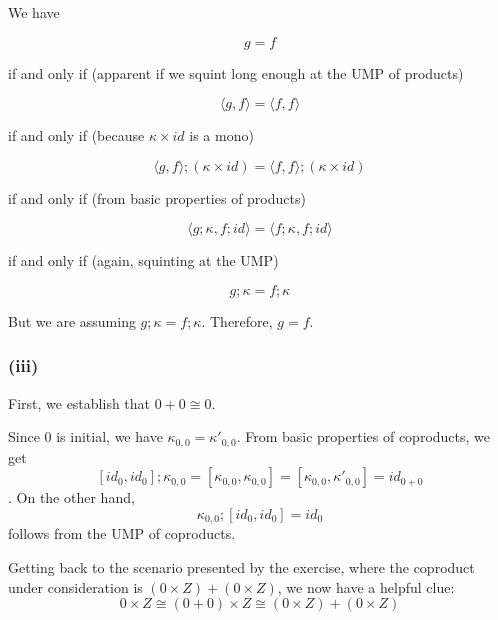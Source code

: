 \documentclass{article}
\begin{document}
We have 

$$ g = f $$

if and only if (apparent if we squint long enough at the UMP of products)

$$\langle g , f \rangle = \langle f, f \rangle$$

if and only if (because $\kappa \times id$ is a mono)

$$\langle g, f \rangle;(\kappa \times id) = \langle f, f \rangle;(\kappa \times id)$$

if and only if (from basic properties of products)

$$\langle g;\kappa, f;id \rangle = \langle f;\kappa, f;id \rangle$$

if and only if (again, squinting at the UMP)

$$ g;\kappa = f;\kappa $$

But we are assuming $g;\kappa = f;\kappa$. Therefore, $g = f$.

\subsubsection*{(iii)}

First, we establish that $0 + 0 \cong 0$.


Since $0$ is initial, we have $\kappa_{0,0} = \kappa'_{0,0}$. From basic properties of coproducts, we get 
$$[id_0,id_0];\kappa_{0,0} = [\kappa_{0,0},\kappa_{0,0}] = [\kappa_{0,0}, \kappa'_{0,0}] = id_{0 + 0}$$.
On the other hand,
$$\kappa_{0,0};[id_0,id_0] = id_{0}$$
follows from the UMP of coproducts.

Getting back to the scenario presented by the exercise, where the coproduct under consideration is 
$(0 \times Z) + (0 \times Z)$, we now have a helpful clue:
$$0 \times Z \cong (0 + 0) \times Z \cong (0 \times Z) + (0 \times Z)$$ 


\end{document}
